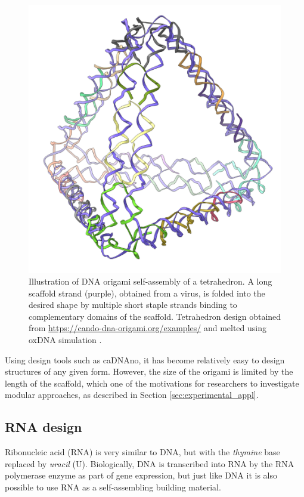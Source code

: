 \begin{figure}
    \centering\includegraphics[width=\textwidth/3]{figures/melt/assembled.png}
    \caption{Illustration of DNA origami self-assembly of a tetrahedron. A long scaffold strand (purple), obtained from a virus, is folded into the desired shape by multiple short staple strands binding to complementary domains of the scaffold. Tetrahedron design obtained from \url{https://cando-dna-origami.org/examples/} and melted using oxDNA simulation \cite{ouldridge2010dna}.
    }
    \label{fig:dnaOrigami}
\end{figure}

Using design tools such as caDNAno\cite{douglas2009rapid}, it has become relatively easy to design structures of any given form. However, the size of the origami is limited by the length of the scaffold, which one of the motivations for researchers to investigate modular approaches, as described in Section \ref{sec:experimental_appl}.

\subsection{RNA design}
Ribonucleic acid (RNA) is very similar to DNA, but with the \emph{thymine} base replaced by \emph{uracil} (U). Biologically, DNA is transcribed into RNA by the RNA polymerase enzyme as part of gene expression, but just like DNA it is also possible to use RNA as a self-assembling building material.


